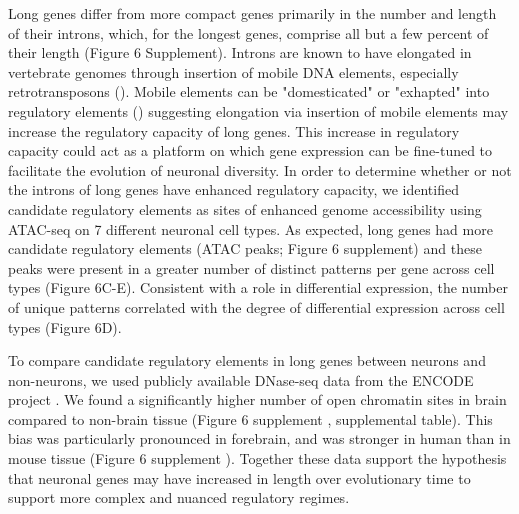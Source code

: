 Long genes differ from more compact genes primarily in the number and length of their introns, which, for the longest genes, comprise all but a few percent of their length (Figure 6 Supplement). Introns are known to have elongated in vertebrate genomes through insertion of mobile DNA elements, especially retrotransposons (). Mobile elements can be "domesticated" or "exhapted" into regulatory elements () suggesting elongation via insertion of mobile elements may increase the regulatory capacity of long genes. This increase in regulatory capacity could act as a platform on which gene expression can be fine-tuned to facilitate the evolution of neuronal diversity. In order to determine whether or not the introns of long genes have enhanced regulatory capacity, we identified candidate regulatory elements as sites of enhanced genome accessibility using ATAC-seq \cite{Buenrostro_2013} on 7 different neuronal cell types. As expected, long genes had more candidate regulatory elements (ATAC peaks; Figure 6 supplement) and these peaks were present in a greater number of distinct patterns per gene across cell types (Figure 6C-E). Consistent with a role in differential expression, the number of unique patterns correlated with the degree of differential expression across cell types (Figure 6D).

To compare candidate regulatory elements in long genes between neurons and non-neurons, we used publicly available DNase-seq data from the ENCODE project \cite{Dunham_2012}. We found a significantly higher number of open chromatin sites in brain compared to non-brain tissue (Figure 6 supplement , supplemental table). This bias was  particularly pronounced in forebrain, and was stronger in human than in mouse tissue (Figure 6 supplement ). Together these data support the hypothesis that neuronal genes may have increased in length over evolutionary time to support more complex and nuanced regulatory regimes. 